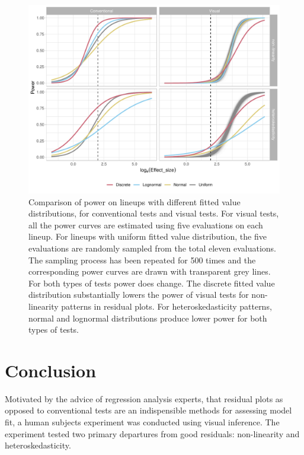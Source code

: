 \documentclass[]{interact}
\theoremstyle{plain}%
\theoremstyle{definition}
\theoremstyle{remark}
\begin{document}
\begin{figure}

{\centering \includegraphics[width=1\linewidth]{paper_comparison_files/figure-latex/different-x-dist-poly-power-1} 

}

\caption{Comparison of power on lineups with different fitted value distributions, for conventional tests and visual tests. For visual tests, all the power curves are estimated using five evaluations on each lineup. For lineups with uniform fitted value distribution, the five evaluations are randomly sampled from the total eleven evaluations. The sampling process has been repeated for 500 times and the corresponding power curves are drawn with transparent grey lines. For both types of tests power does change. The discrete fitted value distribution substantially lowers the power of visual tests for non-linearity patterns in residual plots. For heteroskedasticity patterns, normal and lognormal distributions produce lower power for both types of tests.}\label{fig:different-x-dist-poly-power}
\end{figure}

\hypertarget{conclusion}{%
\section{Conclusion}\label{conclusion}}

Motivated by the advice of regression analysis experts, that residual
plots as opposed to conventional tests are an indispensible methods for
assessing model fit, a human subjects experiment was conducted using
visual inference. The experiment tested two primary departures from good
residuals: non-linearity and heteroskedasticity.
\end{document}
